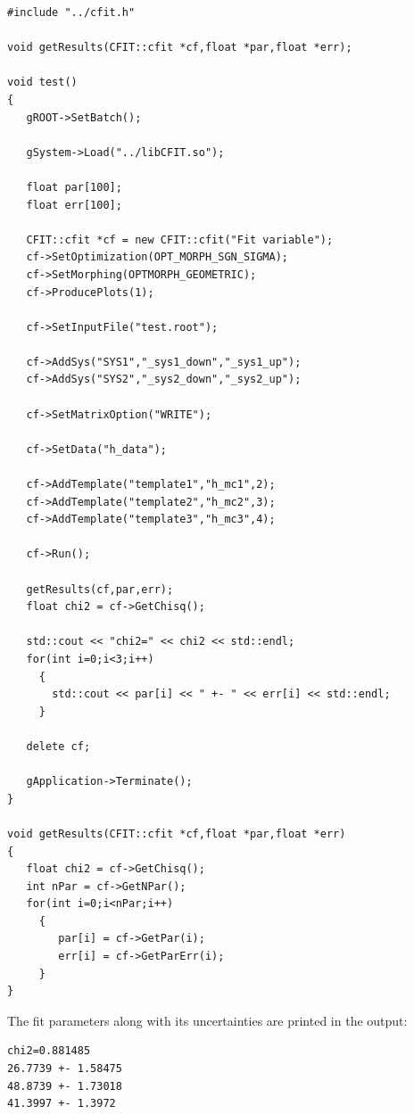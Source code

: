 \documentclass[12pt]{article}
\begin{document}
\begin{verbatim}
#include "../cfit.h"

void getResults(CFIT::cfit *cf,float *par,float *err);

void test()
{
   gROOT->SetBatch();
   
   gSystem->Load("../libCFIT.so");

   float par[100];
   float err[100];
   
   CFIT::cfit *cf = new CFIT::cfit("Fit variable");
   cf->SetOptimization(OPT_MORPH_SGN_SIGMA);
   cf->SetMorphing(OPTMORPH_GEOMETRIC);
   cf->ProducePlots(1);
   
   cf->SetInputFile("test.root");

   cf->AddSys("SYS1","_sys1_down","_sys1_up");
   cf->AddSys("SYS2","_sys2_down","_sys2_up");

   cf->SetMatrixOption("WRITE");
   
   cf->SetData("h_data");

   cf->AddTemplate("template1","h_mc1",2);
   cf->AddTemplate("template2","h_mc2",3);
   cf->AddTemplate("template3","h_mc3",4);

   cf->Run();
   
   getResults(cf,par,err);
   float chi2 = cf->GetChisq();
   
   std::cout << "chi2=" << chi2 << std::endl;
   for(int i=0;i<3;i++)
     {
       std::cout << par[i] << " +- " << err[i] << std::endl;
     }   

   delete cf;
   
   gApplication->Terminate();
}

void getResults(CFIT::cfit *cf,float *par,float *err)
{   
   float chi2 = cf->GetChisq();
   int nPar = cf->GetNPar();
   for(int i=0;i<nPar;i++)
     {
        par[i] = cf->GetPar(i);
        err[i] = cf->GetParErr(i);	
     }
}
\end{verbatim}

The fit parameters along with its uncertainties are printed in the
output:

\begin{verbatim}
chi2=0.881485
26.7739 +- 1.58475
48.8739 +- 1.73018
41.3997 +- 1.3972
\end{verbatim}

\FloatBarrier
\end{document}
